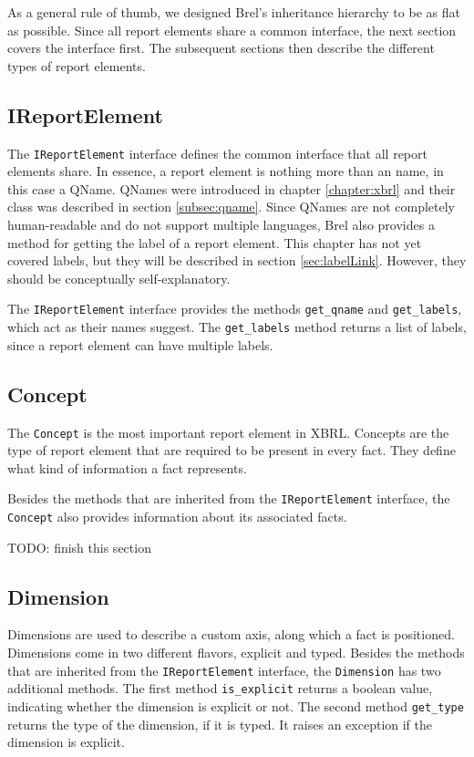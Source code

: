 As a general rule of thumb, we designed Brel's inheritance hierarchy to be as flat as possible.
Since all report elements share a common interface, the next section covers the interface first.
The subsequent sections then describe the different types of report elements.

\subsection{IReportElement}

The \texttt{IReportElement} interface defines the common interface that all report elements share.
In essence, a report element is nothing more than an name, in this case a QName.
QNames were introduced in chapter \ref{chapter:xbrl} and their class was described in section \ref{subsec:qname}.
Since QNames are not completely human-readable and do not support multiple languages,
Brel also provides a method for getting the label of a report element.
This chapter has not yet covered labels, but they will be described in section \ref{sec:labelLink}.
However, they should be conceptually self-explanatory.

The \texttt{IReportElement} interface provides the methods \texttt{get\_qname} and \texttt{get\_labels}, 
which act as their names suggest.
The \texttt{get\_labels} method returns a list of labels, since a report element can have multiple labels.

\subsection{Concept}

The \texttt{Concept} is the most important report element in XBRL.
Concepts are the type of report element that are required to be present in every fact.
They define what kind of information a fact represents.

Besides the methods that are inherited from the \texttt{IReportElement} interface,
the \texttt{Concept} also provides information about its associated facts.

TODO: finish this section

\subsection{Dimension}

Dimensions are used to describe a custom axis, along which a fact is positioned.
Dimensions come in two different flavors, explicit and typed.
Besides the methods that are inherited from the \texttt{IReportElement} interface,
the \texttt{Dimension} has two additional methods.
The first method \texttt{is\_explicit} returns a boolean value, indicating whether the dimension is explicit or not.
The second method \texttt{get\_type} returns the type of the dimension, if it is typed.
It raises an exception if the dimension is explicit.

